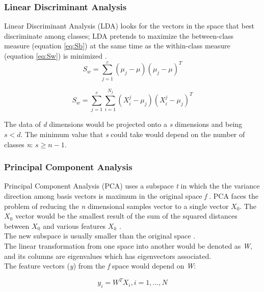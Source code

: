 \subsubsection{Linear Discriminant Analysis}
Linear Discriminant Analysis (LDA) looks for the vectors in the space that best discriminate among classes; LDA pretends to maximize the between-class measure (equation \ref{eq:Sb}) at the same time as the within-class measure (equation \ref{eq:Sw}) is minimized \cite{PCAvsLDA}.\\

\begin{equation}
S_w = \sum^c_{j=1}(\mu _j - \mu)(\mu _j - \mu)^T
\end{equation}\label{eq:Sb}

\begin{equation}
S_w = \sum^c_{j=1}\sum^{N_j}_{i=1}(X_i^j - \mu _j)(X_i^j - \mu _j)^T
\end{equation}\label{eq:Sw}

The data of \textit{d} dimensions would be projected onto a \textit{s} dimensions and being $s < d$. The minimum value that \textit{s} could take would depend on the number of classes \textit{n}: $s \geq n-1$.


\subsubsection{Principal Component Analysis}
Principal Component Analysis (PCA) uses a subspace \textit{t} in which the the variance direction among basis vectors is maximum in the original space \textit{f} \cite{PCAvsLDA}. PCA faces the problem of reducing the \textit{n} dimensional samples vector to a single vector $X_0$. The $X_0$ vector would be the smallest result of the sum of the squared distances between $X_0$ and various features $X_k$ \cite{Duda}.\\

The new subspace is usually smaller than the original space \cite{PCAvsLDA}.\\

The linear transformation from one space into another would be denoted as \textit{W}, and its columns are eigenvalues which has eigenvectors associated.\\

The feature vectors (\textit{y}) from the \textit{f} space would depend on \textit{W}:

\begin{equation}
y_{i} = W^TX_{i}, i=1,...,N
\end{equation}

